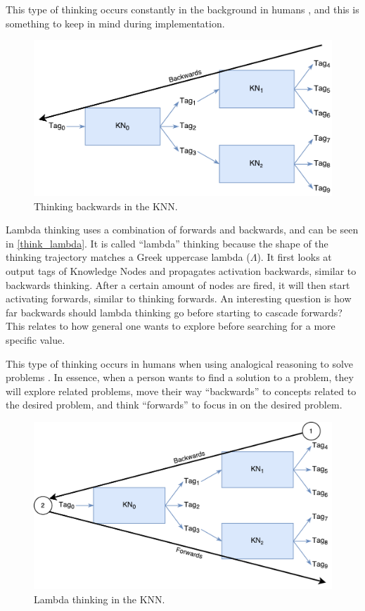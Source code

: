 \documentclass[titlepage,11pt]{article}
\begin{document}
This type of thinking occurs constantly in the background in humans \cite{vybihal-knowledge}, and this is something to keep in mind during implementation.

\begin{figure}[!htb]
	\includegraphics[width=\columnwidth]{figures/backwards_thinking.pdf}
	\caption{Thinking backwards in the KNN.}
	\label{think_backwards}
\end{figure}

Lambda thinking uses a combination of forwards and backwards, and can be seen in \autoref{think_lambda}. It is called ``lambda'' thinking because the shape of the thinking trajectory matches a Greek uppercase lambda ($\Lambda$). It first looks at output tags of Knowledge Nodes and propagates activation backwards, similar to backwards thinking. After a certain amount of nodes are fired, it will then start activating forwards, similar to thinking forwards. An interesting question is how far backwards should lambda thinking go before starting to cascade forwards? This relates to how general one wants to explore before searching for a more specific value.

This type of thinking occurs in humans when using analogical reasoning to solve problems \cite{vybihal-lambda}. In essence, when a person wants to find a solution to a problem, they will explore related problems, move their way ``backwards'' to concepts related to the desired problem, and think ``forwards'' to focus in on the desired problem.

\begin{figure}[!htb]
\includegraphics[width=\columnwidth]{figures/lambda_thinking.pdf}
\caption{Lambda thinking in the KNN.}
\label{think_lambda}
\end{figure}
\end{document}

